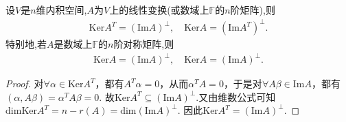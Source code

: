 \documentclass[../../main.tex]{subfiles}%
\begin{document}
\begin{proposition}\label{proposition:一些常见的正交补空间}
设$V$是$n$维内积空间,$A$为$V$上的线性变换(或数域上$\mathbb{F}$的$n$阶矩阵),则
\begin{align*}
\mathrm{Ker}A^T=\left( \mathrm{Im}A \right) ^{\bot} ,\quad \mathrm{Ker}A=\left( \mathrm{Im}A^T \right) ^{\bot}.
\end{align*}
特别地,若$A$是数域上$\mathbb{F}$的$n$阶对称矩阵,则
\begin{align*}
\mathrm{Ker}A=\left( \mathrm{Im}A \right) ^{\bot} ,\quad \mathrm{Ker}A=\left( \mathrm{Im}A \right) ^{\bot}.
\end{align*}
\end{proposition}
\begin{proof}
对$\forall \alpha \in \mathrm{Ker}A^T$，都有$A^T\alpha =0$，从而$\alpha ^TA=0$，于是对$\forall A\beta \in \mathrm{Im}A$，都有
$\left( \alpha ,A\beta \right) =\alpha ^TA\beta =0.$
故$\mathrm{Ker}A^T\subseteq \left( \mathrm{Im}A \right) ^{\bot}$.又由维数公式可知
$\mathrm{dimKer}A^T=n-r\left( A \right) =\mathrm{dim}\left( \mathrm{Im}A \right) ^{\bot}.$
因此$\mathrm{Ker}A^T=\left( \mathrm{Im}A \right) ^{\bot}.$
\end{proof}
\end{document}

